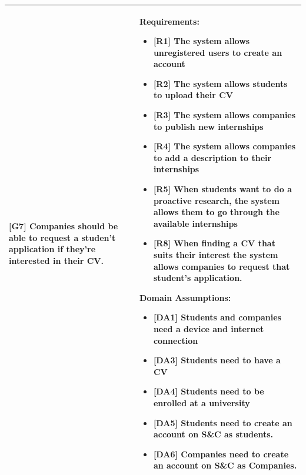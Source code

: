 \begin{longtable}{|p{}|p{}|}
\hline
\textbf{[G7]}  Companies should be able to request a studen't application if they're interested in their CV.
& 
\textbf{Requirements:}
\begin{itemize}
    \item \textbf{[R1]} The system allows unregistered users to create an account
    \item \textbf{[R2]} The system allows students to upload their CV
    \item \textbf{[R3]} The system allows companies to publish new internships
    \item \textbf{[R4]} The system allows companies to add a description to their internships
    \item \textbf{[R5]} When students want to do a proactive research, the system allows them to go through the available internships
    \item \textbf{[R8]} When finding a CV that suits their interest the system allows companies to request that student's application.
\end{itemize}
\textbf{Domain Assumptions:}
\begin{itemize}
     \item \textbf{[DA1]} Students and companies need a device and internet connection
     \item \textbf{[DA3]} Students need to have a CV
     \item \textbf{[DA4]} Students need to be enrolled at a university
    \item \textbf{[DA5]} Students need to create an account on S\&C as students.
    \item \textbf{[DA6]} Companies need to create an account on S\&C as Companies.
\end{itemize} \\
\hline



\end{longtable}
